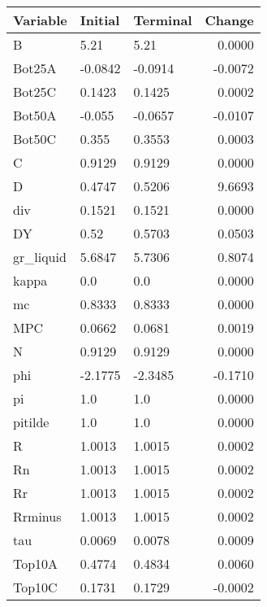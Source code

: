 \begin{table}
\centering
\label{tab:stst_comparison_slow_shock_limit_permanent_asymmetric}
\begin{tabular}{lllr}
\toprule
                Variable & Initial & Terminal &  Change \\
\midrule
                       B &    5.21 &     5.21 &  0.0000 \\
                  Bot25A & -0.0842 &  -0.0914 & -0.0072 \\
                  Bot25C &  0.1423 &   0.1425 &  0.0002 \\
                  Bot50A &  -0.055 &  -0.0657 & -0.0107 \\
                  Bot50C &   0.355 &   0.3553 &  0.0003 \\
                       C &  0.9129 &   0.9129 &  0.0000 \\
                       D &  0.4747 &   0.5206 &  9.6693 \\
                     div &  0.1521 &   0.1521 &  0.0000 \\
                      DY &    0.52 &   0.5703 &  0.0503 \\
               gr\_liquid &  5.6847 &   5.7306 &  0.8074 \\
                   kappa &     0.0 &      0.0 &  0.0000 \\
                      mc &  0.8333 &   0.8333 &  0.0000 \\
                     MPC &  0.0662 &   0.0681 &  0.0019 \\
                       N &  0.9129 &   0.9129 &  0.0000 \\
                     phi & -2.1775 &  -2.3485 & -0.1710 \\
                      pi &     1.0 &      1.0 &  0.0000 \\
                 pitilde &     1.0 &      1.0 &  0.0000 \\
                       R &  1.0013 &   1.0015 &  0.0002 \\
                      Rn &  1.0013 &   1.0015 &  0.0002 \\
                      Rr &  1.0013 &   1.0015 &  0.0002 \\
                 Rrminus &  1.0013 &   1.0015 &  0.0002 \\
                     tau &  0.0069 &   0.0078 &  0.0009 \\
                  Top10A &  0.4774 &   0.4834 &  0.0060 \\
                  Top10C &  0.1731 &   0.1729 & -0.0002 \\

\end{tabular}
\end{table}
